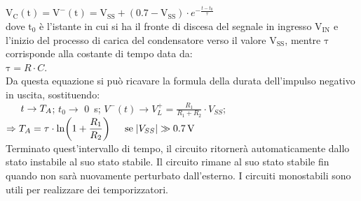 \documentclass{report}
\begin{document}
\\[4pt]\indent$\displaystyle{\mathrm{V_C(t)}=\mathrm{V^-(t)}=\mathrm{V_{SS}}+(0.7-\mathrm{V_{SS}}) \cdot e^{-\frac{t-t_0}{\tau}}}$
\\[2pt]dove $\mathrm{t_0}$ è l'istante in cui si ha il fronte di discesa del segnale in ingresso $\mathrm{V_{IN}}$ e l'inizio del processo di carica del condensatore verso il valore $\mathrm{V_{SS}}$, mentre $\mathrm{\tau}$ corrisponde alla costante di tempo data da: \\\indent$\displaystyle{\mathrm{\tau}= R \cdot C}$.
\\Da questa equazione si può ricavare la formula della durata dell'impulso negativo in uscita, sostituendo:\\
$\indent t\rightarrow T_A$; \indent$t_0\rightarrow$ \SI{0}{\second}; \indent $\displaystyle{V^-(t)\rightarrow V_L^+=\frac{R_1}{R_1+R_2}\cdot V_{SS}}$;
\\[4pt]\indent\indent$\displaystyle{\Rightarrow T_A=\tau\cdot\ln\biggl(1+\frac{R_1}{R_2}\biggr)\indent \mathrm{se\;}|V_{SS}|\gg\SI{0.7}{\volt}}$
\\[4pt]Terminato quest'intervallo di tempo, il circuito ritornerà automaticamente dallo stato instabile al suo stato stabile. Il circuito rimane al suo stato stabile fin quando non sarà nuovamente perturbato dall'esterno. I circuiti monostabili sono utili per realizzare dei temporizzatori.
\end{document}
